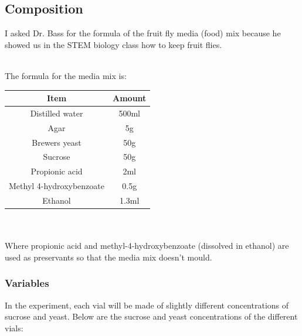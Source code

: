 \documentclass{article}
\begin{document}
\subsection{Composition}

I asked Dr. Bass for the formula of the fruit fly media (food) mix because he showed us in the STEM biology class how to keep fruit flies.

\noindent\\
The formula for the media mix is:\\

{
\centering
\begin{tabular}{|c|c|}
  \hline
  Item & Amount\\
  \hline
  \hline
  Distilled water & 500ml\\
  Agar & 5g\\
  Brewers yeast & 50g\\
  Sucrose & 50g\\
  Propionic acid & 2ml\\
  Methyl 4-hydroxybenzoate & 0.5g\\
  Ethanol & 1.3ml\\
  \hline
\end{tabular}
\par
}

\noindent\\\\
Where propionic acid and methyl-4-hydroxybenzoate (dissolved in ethanol) are used as preservants so that the media mix doesn't mould.

\subsubsection{Variables}

In the experiment, each vial will be made of slightly different concentrations of sucrose and yeast. Below are the sucrose and yeast concentrations of the different vials:\\
\end{document}
